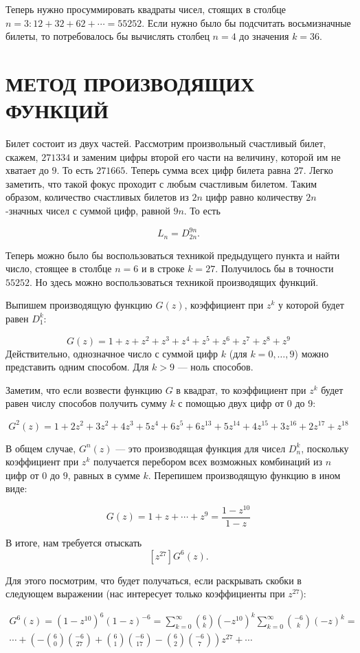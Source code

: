 \documentclass[12pt, letterpaper]{extarticle}
\begin{document}
Теперь нужно просуммировать квадраты чисел, стоящих в столбце $n=3: 12+32+62 +\dotsb=55252$. Если нужно было бы подсчитать восьмизначные билеты, то потребовалось бы вычислять столбец $n=4$ до значения $k=36$.
\section{МЕТОД ПРОИЗВОДЯЩИХ ФУНКЦИЙ}

Билет состоит из двух частей. Рассмотрим произвольный счастливый билет, скажем, $271334$ и заменим цифры второй его части на величину, которой им не хватает до $9$. То есть $271665$. Теперь сумма всех цифр билета равна $27$. Легко заметить, что такой фокус проходит с любым счастливым билетом. Таким образом, количество счастливых билетов из $2n$ цифр равно количеству $2n$-значных чисел с суммой цифр, равной $9n$. То есть

\[
  L_n = D_{2n}^{9n}.
\]

Теперь можно было бы воспользоваться техникой предыдущего пункта и найти число, стоящее в столбце $n=6$ и в строке $k=27$. Получилось бы в точности $55252$. Но здесь можно воспользоваться техникой производящих функций.

Выпишем производящую функцию $G(z)$, коэффициент при $z^k$ у которой будет равен $D_1^k$:

\[
  G(z) = 1+z+z^2+z^3+z^4+z^5+z^6+z^7+z^8+z^9
\]
Действительно, однозначное число с суммой цифр $k$ (для $k=0,\dotsc,9$) можно представить одним способом. Для $k>9$ — ноль способов.

Заметим, что если возвести функцию $G$ в квадрат, то коэффициент при $z^k$ будет равен числу способов получить сумму $k$ с помощью двух цифр от $0$ до $9$:

\[
  G^2(z) = 1+2z^2+3z^2+4z^3+5z^4+6z^5+6z^{13}+5z^{14}+4z^{15}+3z^{16}+2z^{17}+z^{18}
\]

В общем случае, $G^n(z)$ — это производящая функция для чисел $D_n^k$, поскольку коэффициент при $z^k$ получается перебором всех возможных комбинаций из $n$ цифр от $0$ до $9$, равных в сумме $k$. Перепишем производящую функцию в ином виде:

\[
  G(z) = 1+z+\dotsb+z^9 = \frac{1-z^{10}}{1-z}
\]

В итоге, нам требуется отыскать
\[
  [z^{27}]G^6(z).
\]

Для этого посмотрим, что будет получаться, если раскрывать скобки в следующем выражении (нас интересует только коэффициенты при $z^{27}$):

\begin{gather*}
  G^6(z)=(1-z^{10})^6(1-z)^{-6}=\sum_{k=0}^{\infty}{\binom{6}{k}(-z^{10})^k}\sum_{k=0}^{\infty}{\binom{-6}{k}(-z)^k}=\\
 \dotsb +\left(-\binom{6}{0}\binom{-6}{27}+\binom{6}{1}\binom{-6}{17}-\binom{6}{2}\binom{-6}{7}\right)z^{27}+\dotsb
\end{gather*}
\end{document}
